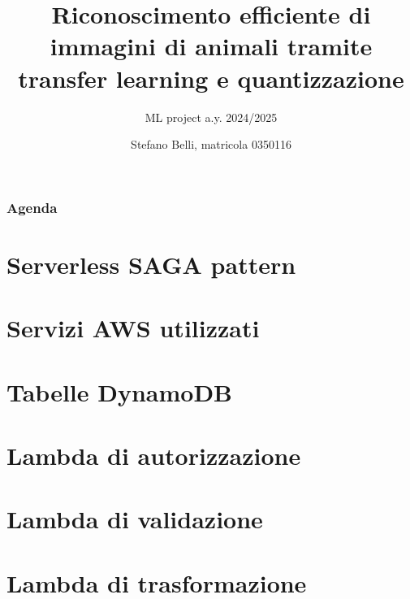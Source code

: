\documentclass{beamer}
\title[Transfer learning e quantizzazione]
{Riconoscimento efficiente di immagini di animali tramite transfer learning e quantizzazione}
\subtitle{ML project a.y. 2024/2025}
\author[Stefano Belli, 0350116]{Stefano Belli, matricola 0350116}
\institute[uniroma2]{Università degli Studi di Roma "Tor Vergata"}
\date{}
\begin{document}
\begin{frame}
    \titlepage
\end{frame}

\begin{frame}
    \frametitle{Agenda}
    \tableofcontents
\end{frame}

\section{Serverless SAGA pattern}
\begin{frame}

\end{frame}

\section{Servizi AWS utilizzati}
\begin{frame}

\end{frame}

\section{Tabelle DynamoDB}
\begin{frame}

\end{frame}

\section{Lambda di autorizzazione}
\begin{frame}
    
\end{frame}

\section{Lambda di validazione}
\begin{frame}

\end{frame}

\section{Lambda di trasformazione}
\begin{frame}

\end{frame}
\end{document}

